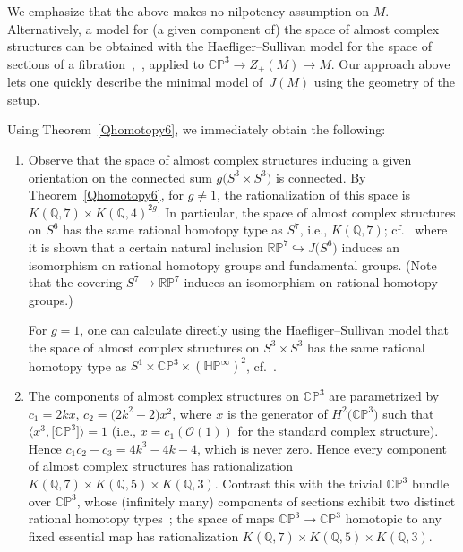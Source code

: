 \documentclass[pdftex]{sigma}%
\newcommand{\RP}{\mathbb{RP}}
\newcommand{\CP}{\mathbb{CP}}
\newcommand{\HP}{\mathbb{HP}}
\newcommand{\QQ}{\mathbb{Q}}
\numberwithin{equation}{section}
\begin{document}
We emphasize that the above makes no nilpotency assumption on $M$. Alternatively, a model for (a given component of) the space of almost complex structures can be obtained with the Haefliger--Sullivan model for the space of sections of a fibration~\cite[Section~11]{S77},~\cite{H82}, applied to $\CP^3 \to Z_+(M) \to M$. Our approach above lets one quickly describe the minimal model of~$J(M)$ using the geometry of the setup.

\begin{Example}\label{examplesQhomotopy} Using Theorem~\ref{Qhomotopy6}, we immediately obtain the following:
\begin{enumerate}\itemsep=0pt
\item Observe that the space of almost complex structures inducing a given orientation on the connected sum $g\big(S^3 \times S^3\big)$ is connected. By Theorem~\ref{Qhomotopy6}, for $g \neq 1$, the rationalization of this space is $K(\QQ, 7) \times K(\QQ, 4)^{2g}$. In particular, the space of almost complex structures on $S^6$ has the same rational homotopy type as $S^7$, i.e., $K(\QQ,7)$; cf.~\cite{FGM21} where it is shown that a certain natural inclusion $\RP^7 \hookrightarrow J\big(S^6\big)$ induces an isomorphism on rational homotopy groups and fundamental groups. (Note that the covering $S^7 \to \RP^7$ induces an isomorphism on rational homotopy groups.)

For $g=1$, one can calculate directly using the Haefliger--Sullivan model that the space of almost complex structures on $S^3 \times S^3$ has the same rational homotopy type as $S^1 \times \CP^3 \times (\HP^\infty)^2$, cf.~\cite[Example~5.4]{FGM21}.

\item The components of almost complex structures on $\mathbb{CP}^3$ are parametrized by $c_1 = 2kx$, $c_2 = \big(2k^2-2\big)x^2$, where $x$ is the generator of $H^2\big(\CP^3\big)$ such that $\big\langle x^3, \big[\CP^3\big]\big\rangle = 1$ (i.e., $x = c_1(\mathcal{O}(1))$ for the standard complex structure). Hence $c_1c_2 - c_3 = 4k^3 - 4k - 4$, which is never zero. Hence every component of almost complex structures has rationalization $K(\QQ,7) \times K(\QQ,5) \times K(\QQ,3)$. Contrast this with the trivial $\CP^3$ bundle over $\CP^3$, whose (infinitely many) components of sections exhibit two distinct rational homotopy types~\cite[Example~3.4]{MR85}; the space of maps $\CP^3 \to \CP^3$ homotopic to any fixed essential map has rationalization $K(\QQ,7)\times K(\QQ,5)\times K(\QQ,3)$. \end{enumerate} \end{Example}
\end{document}
